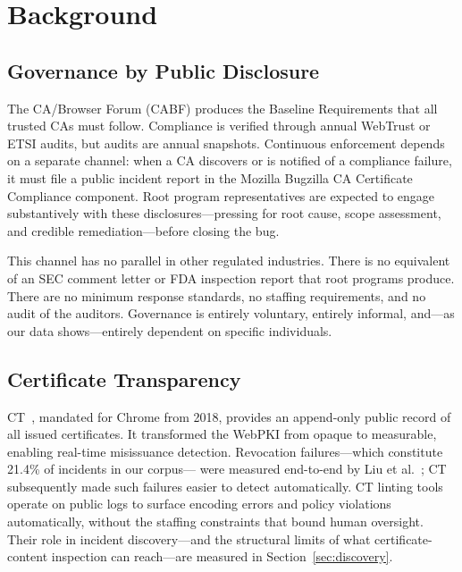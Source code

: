 \documentclass[10pt,twocolumn,letterpaper]{article}
\begin{document}
\section{Background}
\label{sec:background}

\subsection{Governance by Public Disclosure}
The CA/Browser Forum (CABF) produces the Baseline Requirements that all
trusted CAs must follow. Compliance is verified through annual WebTrust or
ETSI audits, but audits are annual snapshots. Continuous enforcement depends
on a separate channel: when a CA discovers or is notified of a compliance
failure, it must file a public incident report in the Mozilla Bugzilla CA
Certificate Compliance component. Root program representatives are expected
to engage substantively with these disclosures---pressing for root cause,
scope assessment, and credible remediation---before closing the bug.

This channel has no parallel in other regulated industries. There is no
equivalent of an SEC comment letter or FDA inspection report that root
programs produce. There are no minimum response standards, no staffing
requirements, and no audit of the auditors. Governance is entirely
voluntary, entirely informal, and---as our data shows---entirely dependent
on specific individuals.

\subsection{Certificate Transparency}
CT~\cite{laurie2014}, mandated for Chrome from 2018, provides an
append-only public record of all issued certificates. It transformed the
WebPKI from opaque to measurable, enabling real-time misissuance detection.
Revocation failures---which constitute 21.4\% of incidents in our corpus---
were measured end-to-end by Liu et al.~\cite{liu2015}; CT subsequently
made such failures easier to detect automatically.
CT linting tools operate on public logs to surface encoding errors and
policy violations automatically, without the staffing constraints that
bound human oversight. Their role in incident discovery---and the
structural limits of what certificate-content inspection can reach---are
measured in Section~\ref{sec:discovery}.
\end{document}
